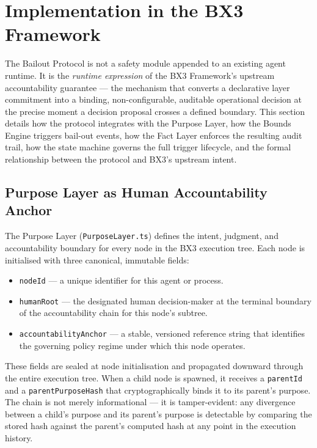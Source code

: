 
\section{Implementation in the BX3 Framework}
\label{sec:bailout-implementation}

The Bailout Protocol is not a safety module appended to an existing agent runtime.
It is the \emph{runtime expression} of the BX3 Framework's upstream accountability
guarantee — the mechanism that converts a declarative layer commitment into a binding,
non-configurable, auditable operational decision at the precise moment a decision
proposal crosses a defined boundary.  This section details how the protocol integrates
with the Purpose Layer, how the Bounds Engine triggers bail-out events, how the Fact Layer
enforces the resulting audit trail, how the state machine governs the full trigger
lifecycle, and the formal relationship between the protocol and BX3's upstream intent.

\subsection{Purpose Layer as Human Accountability Anchor}

The Purpose Layer (\texttt{PurposeLayer.ts}) defines the intent, judgment, and
accountability boundary for every node in the BX3 execution tree.  Each node is
initialised with three canonical, immutable fields:

\begin{itemize}
  \item \texttt{nodeId} — a unique identifier for this agent or process.
  \item \texttt{humanRoot} — the designated human decision-maker at the terminal
        boundary of the accountability chain for this node's subtree.
  \item \texttt{accountabilityAnchor} — a stable, versioned reference string that
        identifies the governing policy regime under which this node operates.
\end{itemize}

These fields are sealed at node initialisation and propagated downward through the
entire execution tree.  When a child node is spawned, it receives a \texttt{parentId}
and a \texttt{parentPurposeHash} that cryptographically binds it to its parent's
purpose.  The chain is not merely informational — it is tamper-evident: any divergence
between a child's purpose and its parent's purpose is detectable by comparing the
stored hash against the parent's computed hash at any point in the execution history.


